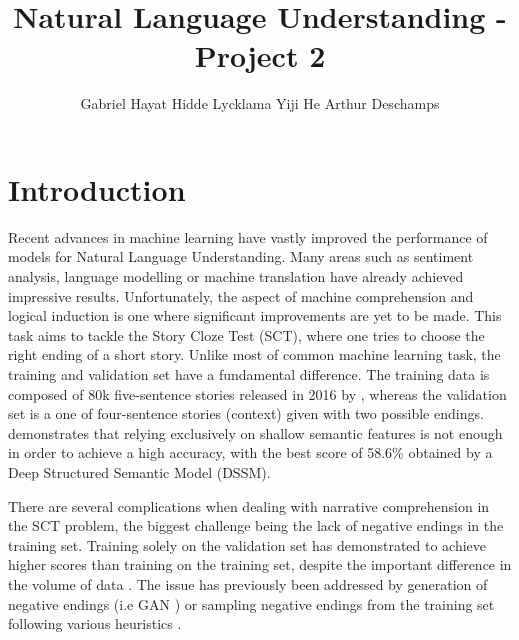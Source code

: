 \documentclass{article}
\title{Natural Language Understanding - Project 2}
\author{Gabriel Hayat \qquad Hidde Lycklama \qquad Yiji He \qquad Arthur Deschamps}
\begin{document}

\maketitle



\section{Introduction}

Recent advances in machine learning have vastly improved the performance of models for Natural Language Understanding. Many areas such as sentiment analysis, language modelling or machine translation have already achieved impressive results. Unfortunately, the aspect of machine comprehension and logical induction is one where significant improvements are yet to be made. This task aims to tackle the Story Cloze Test (SCT), where one tries to choose the right ending of a short story. Unlike most of common machine learning task, the training and validation set have a fundamental difference. The training data is composed of 80k five-sentence stories released in 2016 by \cite{Mostafazaden}, whereas the validation set is a one of four-sentence stories (context) given with two possible endings. \cite{Mostafazaden} demonstrates that relying exclusively on shallow semantic features is not enough in order to achieve a high accuracy, with the best score of 58.6\% obtained by a Deep Structured Semantic Model (DSSM).

There are several complications when dealing with narrative comprehension in the SCT problem, the biggest challenge being the lack of negative endings in the training set. Training solely on the validation set has demonstrated to achieve higher scores than training on the training set, despite the important difference in the volume of data \cite{Roemmele}. The issue has previously been addressed by generation of negative endings (i.e GAN \cite{GAN}) or  sampling negative endings from the training set following various heuristics \cite{Roemmele}. 
\end{document}
